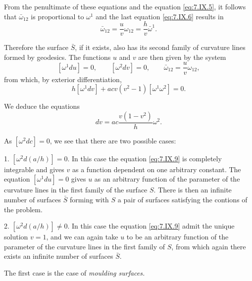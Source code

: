 \documentclass[leqno,11pt]{book}
\numberwithin{equation}{chapter}
\theoremstyle{shape1}
\theoremstyle{shape0}
\theoremstyle{shape2}
\theoremstyle{definition}
\begin{document}
From the penultimate of these equations and the equation \eqref{eq:7.IX.5}, it follows that $\bar\omega_{12}$ is proportional to $\omega^{1}$ and the last equation \eqref{eq:7.IX.6} results in
\[
\bar\omega_{12}=\frac{u}{v}\omega_{12}=\frac{h}{v}\bar\omega^{1}.
\]

Therefore the surface $\bar S$, if it exists, also has its second family of curvature lines formed by geodesics. The functions $u$ and $v$ are then given by the system
\begin{equation}
  \label{eq:7.IX.7}\tag{IX, 7}
  [\omega^{1}du]=0,\qquad[\omega^{2}dv]=0,\qquad\bar\omega_{12}=\frac{u}{v}\omega_{12},
\end{equation}
from which, by exterior differentiation,
\begin{equation}
  \label{eq:7.IX.8}\tag{IX, 8}
  h[\omega^{1}dv]+acv(v^{2}-1)[\omega^{1}\omega^{2}]=0.
\end{equation}

We deduce the equations
\begin{equation}
  \label{eq:7.IX.9}\tag{IX, 9}
  dv=ac\frac{v(1-v^{2})}{h}\omega^{2}.
\end{equation}

As $[\omega^{2}dc]=0$, we see that there are two possible cases:

1. $[\omega^{2}d(a/h)]=0$. In this case the equation \eqref{eq:7.IX.9} is completely integrable and gives $v$ as a function dependent on one arbitrary constant. The equation $[\omega^{1}du]=0$ gives $u$ as an arbitrary function of the parameter of the curvature lines in the first family of the surface $S$. There is then an infinite number of surfaces $\bar S$ forming with $S$ a pair of surfaces satisfying the contions of the problem.

2. $[\omega^{2}d(a/h)]\neq 0$. In this case the equation \eqref{eq:7.IX.9} admit the unique solution $v=1$, and we can again take $u$ to be an arbitrary function of the parameter of the curvature lines in the first family of $S$, from which again there exists an infinite number of surfaces $\bar S$.

The first case is the case of \emph{moulding surfaces.}
\end{document}
